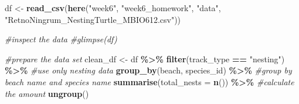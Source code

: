 \documentclass[
]{article}
\newenvironment{Shaded}{\begin{snugshade}}{\end{snugshade}}
\newcommand{\AttributeTok}[1]{\textcolor[rgb]{0.13,0.29,0.53}{#1}}
\newcommand{\CommentTok}[1]{\textcolor[rgb]{0.56,0.35,0.01}{\textit{#1}}}
\newcommand{\FunctionTok}[1]{\textcolor[rgb]{0.13,0.29,0.53}{\textbf{#1}}}
\newcommand{\NormalTok}[1]{#1}
\newcommand{\OtherTok}[1]{\textcolor[rgb]{0.56,0.35,0.01}{#1}}
\newcommand{\SpecialCharTok}[1]{\textcolor[rgb]{0.81,0.36,0.00}{\textbf{#1}}}
\newcommand{\StringTok}[1]{\textcolor[rgb]{0.31,0.60,0.02}{#1}}
\begin{document}
\begin{Shaded}
\begin{Highlighting}[]
\NormalTok{df }\OtherTok{\textless{}{-}} \FunctionTok{read\_csv}\NormalTok{(}\FunctionTok{here}\NormalTok{(}\StringTok{"week6"}\NormalTok{, }\StringTok{"week6\_homework"}\NormalTok{, }\StringTok{"data"}\NormalTok{, }\StringTok{"RetnoNingrum\_NestingTurtle\_MBIO612.csv"}\NormalTok{))}

\CommentTok{\#inspect the data}
\CommentTok{\#glimpse(df)}

\CommentTok{\#prepare the data set}
\NormalTok{clean\_df }\OtherTok{\textless{}{-}}\NormalTok{ df }\SpecialCharTok{\%\textgreater{}\%}
  \FunctionTok{filter}\NormalTok{(track\_type }\SpecialCharTok{==} \StringTok{"nesting"}\NormalTok{) }\SpecialCharTok{\%\textgreater{}\%}   \CommentTok{\#use only nesting data}
  \FunctionTok{group\_by}\NormalTok{(beach, species\_id) }\SpecialCharTok{\%\textgreater{}\%}       \CommentTok{\#group by beach name and species name}
  \FunctionTok{summarise}\NormalTok{(}\AttributeTok{total\_nests =} \FunctionTok{n}\NormalTok{()) }\SpecialCharTok{\%\textgreater{}\%}      \CommentTok{\#calculate the amount }
  \FunctionTok{ungroup}\NormalTok{()}


\end{Highlighting}
\end{Shaded}
\end{document}
